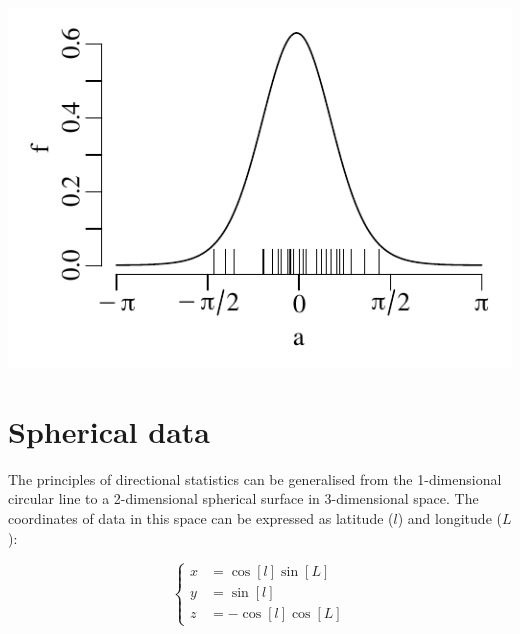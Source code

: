 \noindent\begin{minipage}[t][][b]{.4\textwidth}
\includegraphics[width=\textwidth]{../figures/kappastriations.pdf}\\
\end{minipage}
\begin{minipage}[t][][t]{.6\textwidth}
  \label{fig:kappastriations}
\end{minipage}

\section{Spherical data}
\label{sec:spherical-data}

The principles of directional statistics can be generalised from the
1-dimensional circular line to a 2-dimensional spherical surface in
3-dimensional space. The coordinates of data in this space can be
expressed as latitude ($l$) and longitude ($L$):

\begin{equation}
  \left\{
  \begin{split}
    x & = \cos[l]\sin[L]\\
    y & = \sin[l]\\
    z & = -\cos[l]\cos[L]
  \end{split}
  \right.
  \label{eq:lL}
\end{equation}

